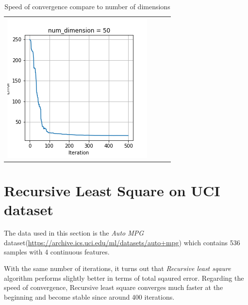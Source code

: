 \documentclass{article}
\begin{document}
\begin{table}[H]
\begin{tabular}{cccc}
\includegraphics[scale=0.3]{RLS-50D.png}
\end{tabular}
\caption{Speed of convergence compare to number of dimensions}
\label{tab:rls-dim}
\end{table}

\section{Recursive Least Square on UCI dataset}
The data used in this section is the \textit{Auto MPG} dataset(\url{https://archive.ics.uci.edu/ml/datasets/auto+mpg}) which contains 536 samples with 4 continuous features.

With the same number of iterations, it turns out that \textit{Recursive least sqaure} algorithm performs slightly better in terms of total sqaured error. Regarding the speed of convergence, Recursive least square converges much faster at the beginning and become stable since around 400 iterations.
\end{document}

